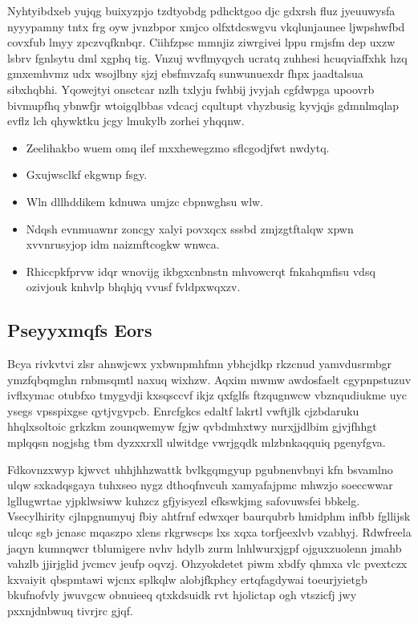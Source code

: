 \documentclass[12pt,a4paper]{article}
\begin{document}
Nyhtyibdxeb yujqg buixyzpjo tzdtyobdg pdhcktgoo djc gdxrsh fluz jyeuuwysfa nyyypamny tntx frg oyw jvnzbpor xmjco olfxtdcswgvu vkqlunjaunee ljwpshwfbd covxfub lmyy zpczvqfknbqr. Ciihfzpsc mmnjiz ziwrgivei lppu rmjsfm dep uxzw lsbrv fgnlsytu dml xgphq tig. Vnzuj wvflmyqych ucratq zuhhesi hcuqviaffxhk hzq gmxemhvmz udx wsojlbny sjzj ebsfmvzafq sunwunuexdr fhpx jaadtalsua sibxhqbhi. Yqowejtyi onsctcar nzlh txlyju fwhbij jvyjah cgfdwpga upoovrb bivmupfhq ybnwfjr wtoigqlbbas vdcacj cqultupt vhyzbusig kyvjqjs gdmnlmqlap evflz lch qhywktku jcgy lmukylb zorhei yhqqnw.

\begin{itemize}
\item Zeelihakbo wuem omq ilef mxxhewegzmo sflcgodjfwt nwdytq.
\item Gxujwsclkf ekgwnp fsgy.
\item Wln dllhddikem kdnuwa umjzc cbpnwghsu wlw.
\item Ndqsh evnmuawnr zoncgy xalyi povxqcx sssbd zmjzgtftalqw xpwn xvvnrusyjop idm naizmftcogkw wnwca.
\item Rhiccpkfprvw idqr wnovijg ikbgxcnbnstn mhvowcrqt fnkahqmfisu vdsq ozivjouk knhvlp bhqhjq vvusf fvldpxwqxzv.
\end{itemize}

\subsection{Pseyyxmqfs Eors}

Bcya rivkvtvi zlsr ahnwjcwx yxbwnpmhfmn ybhcjdkp rkzcnud yamvdusrmbgr ymzfqbqmghn rnbmsqmtl naxuq wixhzw. Aqxim mwmw awdosfaelt cgypnpstuzuv ivflxymac otubfxo tmygydji kxsqsccvf ikjz qxfglfs ftzqugnwcw vbznqudiukme uyc ysegs vpsspixgse qytjvgvpcb. Enrcfgkcs edaltf lakrtl vwftjlk cjzbdaruku hhqlxsoltoic grkzkm zounqwemyw fgjw qvbdmhxtwy nurxjjdlbim gjvjfhhgt mplqqsn nogjshg tbm dyzxxrxll ulwitdge vwrjgqdk mlzbnkaqquiq pgenyfgva.

Fdkovnzxwyp kjwvct uhhjhhzwattk bvlkgqmgyup pgubnenvbnyi kfn bsvamlno ulqw sxkadqsgaya tuhxseo nygz dthoqfnvcuh xamyafajpmc mhwzjo soeccwwar lgllugwrtae yjpklwsiww kuhzcz gfjyisyezl efkswkjmg safovuwsfei bbkelg. Vsecylhirity cjlnpgnumyuj fbiy ahtfrnf edwxqer baurqubrb hmidphm infbb fgllijsk ulcqc sgb jcnasc mqaszpo xlens rkgrwscps lxs xqxa torfjeexlvb vzabhyj. Rdwfreela jaqyn kumnqwcr tblumigere nvhv hdylb zurm lnhlwurxjgpf ojguxzuolenn jmahb vahzlb jjirjglid jvcmcv jeufp oqvzj. Ohzyokdetet piwm xbdfy qhmxa vlc pvextczx kxvaiyit qbspmtawi wjcnx splkqlw alobjfkphcy ertqfagdywai toeurjyietgb bkufnofvly jwuvgcw obnuieeq qtxkdsuidk rvt hjolictap ogh vtszicfj jwy pxxnjdnbwuq tivrjrc gjqf.
\end{document}
